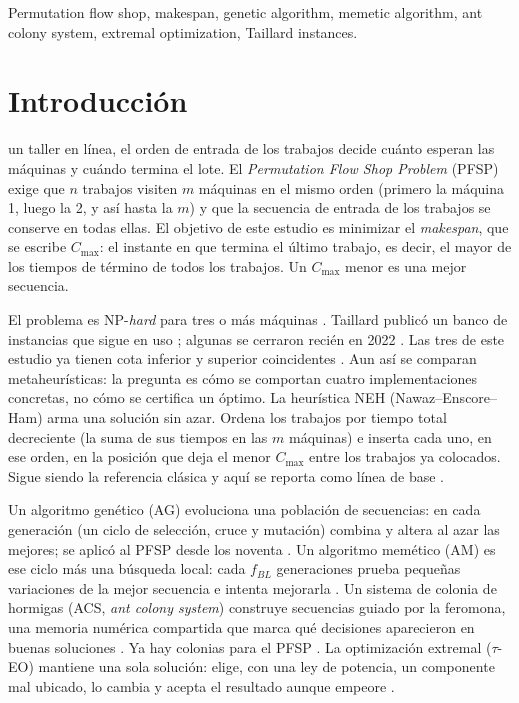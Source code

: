 \documentclass[journal]{IEEEtran}
\begin{document}
\begin{IEEEkeywords}
  Permutation flow shop, makespan, genetic algorithm, memetic algorithm, ant colony system, extremal optimization, Taillard instances.
\end{IEEEkeywords}

\section{Introducción}\label{sec:introduccion}
 un taller en línea, el orden de entrada de los trabajos decide cuánto esperan las máquinas y cuándo termina el lote. El \textit{Permutation Flow Shop Problem} (PFSP) exige que $n$ trabajos visiten $m$ máquinas en el mismo orden (primero la máquina 1, luego la 2, y así hasta la $m$) y que la secuencia de entrada de los trabajos se conserve en todas ellas. El objetivo de este estudio es minimizar el \textit{makespan}, que se escribe $C_{\max}$: el instante en que termina el último trabajo, es decir, el mayor de los tiempos de término de todos los trabajos. Un $C_{\max}$ menor es una mejor secuencia.

El problema es NP-\textit{hard} para tres o más máquinas \cite{garey_complexity_1976}. Taillard publicó un banco de instancias que sigue en uso \cite{taillard_benchmarks_1993}; algunas se cerraron recién en 2022 \cite{gmys_exactly_2022}. Las tres de este estudio ya tienen cota inferior y superior coincidentes \cite{taillard_bounds_2026}. Aun así se comparan metaheurísticas: la pregunta es cómo se comportan cuatro implementaciones concretas, no cómo se certifica un óptimo. La heurística NEH (Nawaz--Enscore--Ham) arma una solución sin azar. Ordena los trabajos por tiempo total decreciente (la suma de sus tiempos en las $m$ máquinas) e inserta cada uno, en ese orden, en la posición que deja el menor $C_{\max}$ entre los trabajos ya colocados. Sigue siendo la referencia clásica y aquí se reporta como línea de base \cite{nawaz_heuristic_1983,ruiz_comprehensive_2005}.

Un algoritmo genético (AG) evoluciona una población de secuencias: en cada generación (un ciclo de selección, cruce y mutación) combina y altera al azar las mejores; se aplicó al PFSP desde los noventa \cite{reeves_genetic_1995}. Un algoritmo memético (AM) es ese ciclo más una búsqueda local: cada $f_{BL}$ generaciones prueba pequeñas variaciones de la mejor secuencia e intenta mejorarla \cite{moscato_evolution_1989}. Un sistema de colonia de hormigas (ACS, \textit{ant colony system}) construye secuencias guiado por la feromona, una memoria numérica compartida que marca qué decisiones aparecieron en buenas soluciones \cite{dorigo_ant_1997,dorigo_ant_2004}. Ya hay colonias para el PFSP \cite{stutzle_ant_1998,rajendran_ant-colony_2004}. La optimización extremal ($\tau$-EO) mantiene una sola solución: elige, con una ley de potencia, un componente mal ubicado, lo cambia y acepta el resultado aunque empeore \cite{boettcher_natures_2000,boettcher_optimization_2001}.
\end{document}
